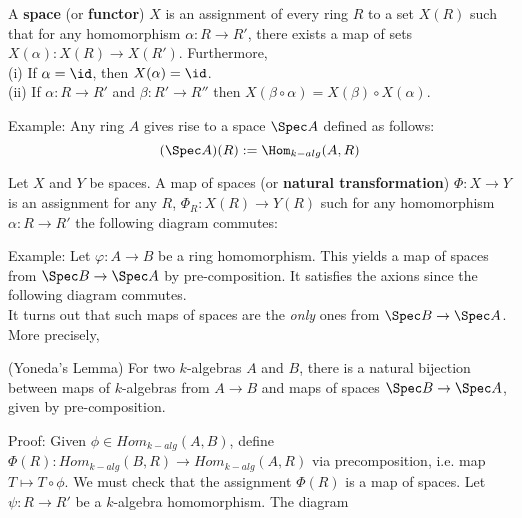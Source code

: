 \documentclass[10 pt]{article}
\newtheorem{cor}{Corollary}[section]
\newtheorem{lem}{Lemma}[section]
\newtheorem{prop}{Proposition}[section]
\newtheorem{propconstr}{Proposition-Construction}[section]
\newcommand\begin{lemma}{\begin{lem}}
\newcommand\begin{proposition}{\begin{prop}}
\newcommand\begin{proof}{\begin{proof}}
\newcommand\begin{corollary}{\begin{cor}}
\newcommand\begin{proposition}constr{\begin{propconstr}}
\newcommand\end{definition}{\end{defn}}
\newcommand\end{lemma}{\end{lem}}
\newcommand\end{corollary}{\end{cor}}
\newcommand\end{proposition}{\end{prop}}
\newcommand\end{proof}{\end{proof}}
\newcommand\end{proposition}constr{\end{propconstr}}
\begin{document}
\begin{definition} A {\bf space} (or {\bf functor}) $X$ is an assignment of every ring $R$ to a set $X(R)$ such that for any homomorphism $\alpha:R\rightarrow R'$, there exists a map of sets $X(\alpha):X(R)\rightarrow X(R')$.  Furthermore,\\
(i) If $\alpha=\id$, then $X(\alpha)=\id$.\\
(ii) If $\alpha:R\rightarrow R'$ and $\beta: R'\rightarrow R''$ then $X(\beta\circ \alpha)=X(\beta)\circ X(\alpha)$.\end{definition}

Example:  Any ring $A$ gives rise to a space $\Spec A$ defined as follows:
$$(\Spec A)(R):=\Hom_{k-alg}(A,R)$$

\begin{definition} Let $X$ and $Y$ be spaces.  A map of spaces (or {\bf natural transformation}) $\Phi:X\rightarrow Y$ is an assignment for any $R$, $\Phi_R:X(R)\rightarrow Y(R)$ such for any homomorphism $\alpha:R\rightarrow R'$ the following diagram commutes:
\end{definition}

Example:  Let $\varphi:A\rightarrow B$ be a ring homomorphism.  This yields a map of spaces from $\Spec B\rightarrow \Spec A$ by pre-composition.  It satisfies the axions since the following diagram commutes.\\

It turns out that such maps of spaces are the {\it only} ones from $\Spec B\rightarrow \Spec A$.  More precisely,

\begin{proposition} (Yoneda's Lemma) For two $k$-algebras $A$ and $B$, there is a natural bijection between maps of $k$-algebras from $A\rightarrow B$ and maps of spaces $\Spec B\rightarrow \Spec A$, given by pre-composition. \end{proposition}

Proof:  Given $\phi\in Hom_{k-alg}(A,B)$, define $\Phi(R): Hom_{k-alg}(B,R) \rightarrow Hom_{k-alg}(A,R)$ via precomposition, i.e. map $T\longmapsto T\circ\phi$.  We must check that the assignment $\Phi(R)$ is a map of spaces.  Let $\psi:R\rightarrow R'$ be a $k$-algebra homomorphism.  The diagram\\
\end{document}
